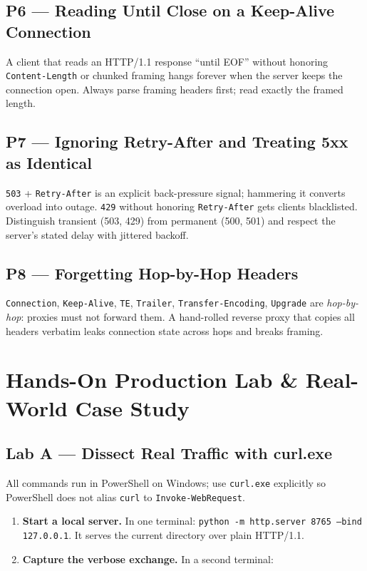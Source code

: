\subsection*{P6 --- Reading Until Close on a Keep-Alive Connection}

A client that reads an HTTP/1.1 response ``until EOF'' without honoring \texttt{Content-Length} or chunked framing hangs forever when the server keeps the connection open. Always parse framing headers first; read exactly the framed length.

\subsection*{P7 --- Ignoring Retry-After and Treating 5xx as Identical}

\texttt{503} + \texttt{Retry-After} is an explicit back-pressure signal; hammering it converts overload into outage. \texttt{429} without honoring \texttt{Retry-After} gets clients blacklisted. Distinguish transient (503, 429) from permanent (500, 501) and respect the server's stated delay with jittered backoff.

\subsection*{P8 --- Forgetting Hop-by-Hop Headers}

\texttt{Connection}, \texttt{Keep-Alive}, \texttt{TE}, \texttt{Trailer}, \texttt{Transfer-Encoding}, \texttt{Upgrade} are \emph{hop-by-hop}: proxies must not forward them. A hand-rolled reverse proxy that copies all headers verbatim leaks connection state across hops and breaks framing.

\section{Hands-On Production Lab \& Real-World Case Study}
\label{sec:lab}

\subsection{Lab A --- Dissect Real Traffic with curl.exe}

All commands run in PowerShell on Windows; use \texttt{curl.exe} explicitly so PowerShell does not alias \texttt{curl} to \texttt{Invoke-WebRequest}.

\begin{enumerate}
  \item \textbf{Start a local server.} In one terminal: \texttt{python -m http.server 8765 --bind 127.0.0.1}. It serves the current directory over plain HTTP/1.1.
  \item \textbf{Capture the verbose exchange.} In a second terminal:
\end{enumerate}

